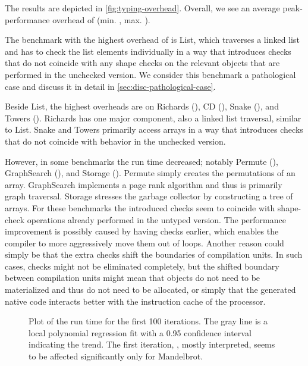 The results are depicted in \cref{fig:typing-overhead}.
Overall, we see an average peak-performance overhead of 
\OverheadTypingGMeanP (min. \OverheadTypingMinP, max. \OverheadTypingMaxP).


The benchmark with the highest overhead of \OverheadListP is List,
which traverses a linked list and has to check the list elements individually
in a way that introduces checks that do not coincide with any shape checks
on the relevant objects that are performed in the unchecked version.
We consider this benchmark a pathological case and discuss it
in detail in \cref{sec:disc-pathological-case}.

Beside List, the highest overheads are on
Richards (\OverheadRichardsP), CD (\OverheadCDP), 
Snake (\OverheadSnakeP), and Towers (\OverheadTowersP).
Richards has one major component, also a linked list traversal,
similar to List.
Snake and Towers primarily access  arrays in a way that introduces checks
that do not coincide with behavior in the unchecked version.


However, in some benchmarks the run time decreased; notably Permute (\OverheadPermuteP),
GraphSearch (\OverheadGraphSearchP), and Storage (\OverheadStorageP).
Permute simply creates the permutations of an array.
GraphSearch implements a page rank algorithm
and thus is primarily graph traversal.
Storage stresses the garbage collector by constructing a tree of arrays.
For these benchmarks the introduced checks seem to coincide with shape-check operations
already performed in the untyped version.
The performance improvement is possibly caused by having checks earlier,
which enables the compiler to more aggressively move them out of loops.
Another reason could simply be that the extra checks shift the boundaries
of compilation units.
In such cases, checks might not be eliminated completely,
but the shifted boundary between compilation units might mean that
objects do not need to be materialized and thus do not need to be allocated,
or simply that the generated native code interacts better with
the instruction cache of the processor.

\begin{figure}
	\TypingWarmup{}
	\caption{Plot of the run time for the first 100 iterations.
           The gray line is a local polynomial regression fit
           with a 0.95 confidence interval
           indicating the trend.
           The first iteration, \ie, mostly interpreted, seems
           to be affected significantly only for Mandelbrot.}
	\label{fig:typing-warmup}
\end{figure}

